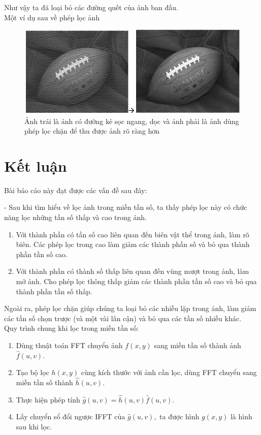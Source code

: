 \documentclass[12pt,a4paper]{report}
\numberwithin{equation}{section}
\theoremstyle{definition} %
\begin{document}
    Như vậy ta đã loại bỏ các đường quết của ảnh ban đầu.
    \\

    Một ví dụ sau về phép lọc ảnh

\begin{figure}[H]
\centering
\includegraphics[width=0.86\linewidth]{img/locChan/bongbauduclocchan.png}
\caption{Ảnh trái là ảnh có đường kẻ sọc ngang, dọc và ảnh phải là ảnh dùng phép lọc chặn để thu được ảnh rõ ràng hơn }
\end{figure}
	\chapter*{Kết luận}
	Bài báo cáo này đạt được các vấn đề sau đây:

   - Sau khi tìm hiểu về lọc ảnh trong miền tần số, ta thấy phép lọc này có chức năng lọc những tần số thấp và cao trong ảnh.
    \begin{enumerate}
        \item Với thành phần có tần số cao liên quan đến biên vật thể trong ảnh, làm rõ biên. Các phép lọc trong cao làm giảm các thành phần số và bỏ qua thành phần tần số cao.
        \item Với thành phần có thành số thấp liên quan đến vùng mượt trong ảnh, làm mở ảnh. Cho phép lọc thông thấp giảm các thành phần tần số cao và bỏ qua thành phần tần số thấp.
    \end{enumerate}

   Ngoài ra, phép lọc chặn giúp chúng ta loại bỏ các nhiễu lặp trong ảnh, làm giảm các tần số chọn trược (và một vài lân cận) và bỏ qua các tần số nhiễu khác.
   \\

   Quy trình chung khi lọc trong miền tần số:

   \begin{enumerate}
       \item Dùng thuật toán FFT chuyển ảnh $f(x,y)$ sang miền tần số thành ảnh $\hat{f}(u,v)$.
       \item Tạo bộ lọc $h(x,y)$ cùng kích thước với ảnh cần lọc, dùng FFT chuyển sang miền tần số thành $\hat{h}(u,v).$
    \item Thực hiện phép tính $\hat{g}(u,v)=\hat{h}(u,v)\hat{f}(u,v).$
    \item Lấy chuyển sổ đổi ngược IFFT của $\hat{g}(u,v),$ ta được hình $g(x,y)$ là hình sau khi lọc.
   \end{enumerate}
	\indent
	\thispagestyle{fancy}
	
\end{document}
